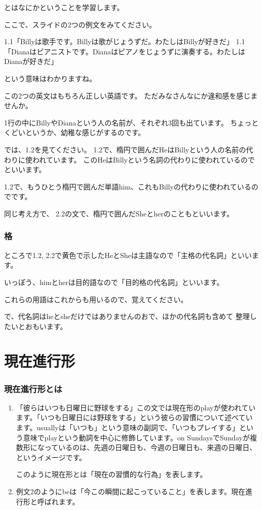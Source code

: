 \documentclass[book,jafontscale=0.9247]{jlreq}
\begin{document}
とはなにかということを学習します。

ここで、スライドの2つの例文をみてください。

1.1「Billyは歌手です。Billyは歌がじょうずだ。わたしはBillyが好きだ」
1.1「Dianaはピアニストです。Dianaはピアノをじょうずに演奏する。わたしはDianaが好きだ」

という意味はわかりますね。

この2つの英文はもちろん正しい英語です。
ただみなさんなにか違和感を感じませんか。

1行の中にBillyやDianaという人の名前が、それぞれ3回も出ています。
ちょっとくどいというか、幼稚な感じがするのです。

では、1.2を見てください。
1.2で、楕円で囲んだHeはBillyという人の名前の代わりに使われています。
このHeはBillyという名詞の代わりに使われているのでといいます。

1.2で、もうひとう楕円で囲んだ単語him、これもBillyの代わりに使われているのでです。

同じ考え方で、
2.2の文で、楕円で囲んだSheとherのこともといいます。

\subsection{格}

ところで1.2, 2.2で黄色で示したHeとSheは主語なので「主格の代名詞」といいます。

いっぽう、himとherは目的語なので「目的格の代名詞」といいます。

これらの用語はこれからも用いるので、覚えてください。

で、代名詞はheとsheだけではありませんのおで、ほかの代名詞も含めて
整理したいとおもいます。





\chapter{現在進行形}
\subsection{現在進行形とは}

\begin{enumerate}
 \item 「彼らはいつも日曜日に野球をする」この文では現在形のplayが使われています。「いつも日曜日には野球をする」という彼らの習慣について述べています。usuallyは「いつも」という意味の副詞で、「いつもプレイする」という意味でplayという動詞を中心に修飾しています。on SundaysでSundayが複数形になっているのは、先週の日曜日も、今週の日曜日も、来週の日曜日、というイメージです。

このように現在形とは「現在の習慣的な行為」を表します。
 \item 例文2のようにbeは「今この瞬間に起こっていること」を表します。現在進行形と呼ばれます。
\end{enumerate}
\end{document}
